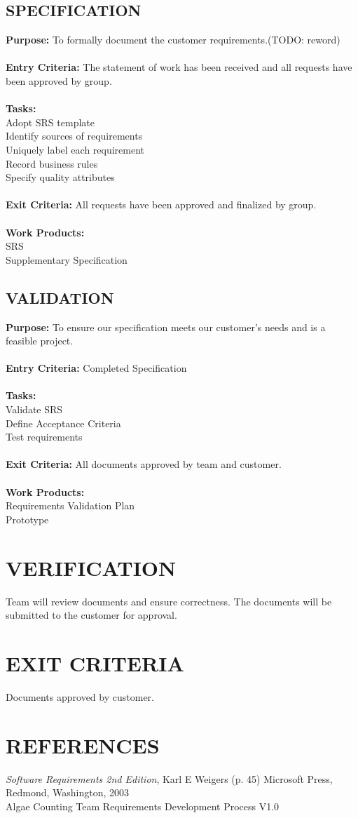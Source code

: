 \documentclass[11pt]{article}
\begin{document}
\subsection{SPECIFICATION}
\textbf{Purpose:}  To formally document the customer requirements.(TODO: reword) \\
\\
\textbf{Entry Criteria:}  The statement of work has been received and all requests have been approved by group. \\
\\
\textbf{Tasks:}  \\
Adopt SRS template \\
Identify sources of requirements \\
Uniquely label each requirement \\
Record business rules \\
Specify quality attributes \\
\\
\textbf{Exit Criteria:}  All requests have been approved and finalized by group. \\
\\
\textbf{Work Products:} \\
SRS \\
Supplementary Specification \\

\subsection{VALIDATION}
\textbf{Purpose:} To ensure our specification meets our customer's needs and is a feasible project. \\
\\
\textbf{Entry Criteria:}  Completed Specification \\
\\
\textbf{Tasks:} \\
Validate SRS \\
Define Acceptance Criteria \\
Test requirements \\
\\
\textbf{Exit Criteria: } All documents approved by team and customer. \\
\\
\textbf{Work Products:} \\
Requirements Validation Plan \\
Prototype \\

\section{VERIFICATION}
Team will review documents and ensure correctness. The documents will be submitted to the customer for approval.

\section{EXIT CRITERIA}
Documents approved by customer.

\section{REFERENCES}
\textit{Software Requirements 2nd Edition}, Karl E Weigers (p. 45) Microsoft Press, Redmond, Washington, 2003
\\
Algae Counting Team Requirements Development Process V1.0
\end{document}
